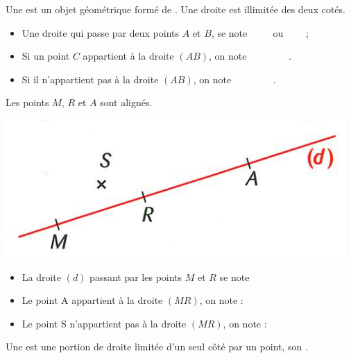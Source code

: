 \begin{mydef}
	Une \kw{\hspace*{3cm}} est un objet géométrique formé de \kw{\hspace*{6cm}}. Une droite est illimitée des deux cotés.
\end{mydef}

\begin{myprops}
	\begin{itemize}
		\item Une droite qui passe par deux points $A$ et $B$, se note $\qquad$ ou $\qquad$;
		\item Si un point $C$ appartient à la droite $(AB)$, on note $\qquad \qquad$.
		\item Si il n'appartient pas à la droite $(AB)$, on note $\qquad \qquad$.
	\end{itemize}
\end{myprops}

\begin{myex}
	Les points $M$, $R$ et $A$ sont alignés.
	\begin{center}
		\includegraphics[scale=0.55]{img/droite1}
	\end{center}

	\begin{itemize}
		\item La droite $(d)$ passant par les points $M$ et $R$ se note 
		\item Le point A appartient à la droite $(MR)$, on note :
		\item Le point S n'appartient pas à la droite $(MR)$, on note :
	\end{itemize}
\end{myex}

\begin{mydef}
	Une \kw{\hspace*{5cm}} est une portion de droite limitée d'un seul côté par un point, son \hspace*{5cm}.
\end{mydef}

